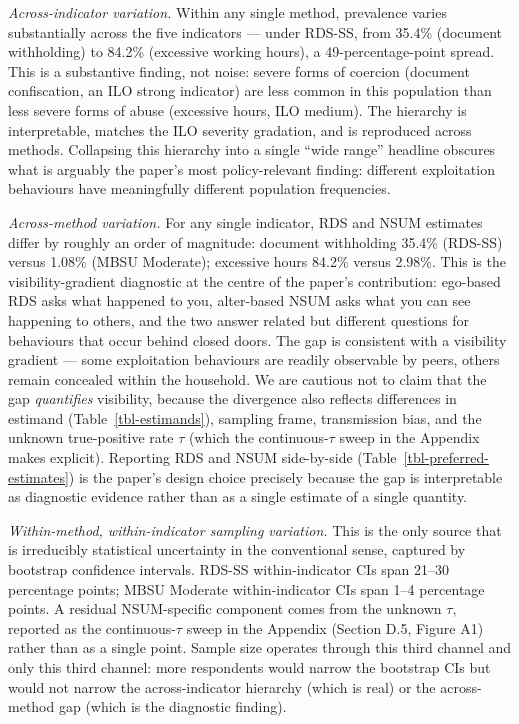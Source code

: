 \documentclass[
  12pt,
  letterpaper,
  DIV=11,
  numbers=noendperiod]{scrartcl}
\begin{document}
\emph{Across-indicator variation.} Within any single method, prevalence
varies substantially across the five indicators --- under RDS-SS, from
35.4\% (document withholding) to 84.2\% (excessive working hours), a
49-percentage-point spread. This is a substantive finding, not noise:
severe forms of coercion (document confiscation, an ILO strong
indicator) are less common in this population than less severe forms of
abuse (excessive hours, ILO medium). The hierarchy is interpretable,
matches the ILO severity gradation, and is reproduced across methods.
Collapsing this hierarchy into a single ``wide range'' headline obscures
what is arguably the paper's most policy-relevant finding: different
exploitation behaviours have meaningfully different population
frequencies.

\emph{Across-method variation.} For any single indicator, RDS and NSUM
estimates differ by roughly an order of magnitude: document withholding
35.4\% (RDS-SS) versus 1.08\% (MBSU Moderate); excessive hours 84.2\%
versus 2.98\%. This is the visibility-gradient diagnostic at the centre
of the paper's contribution: ego-based RDS asks what happened to you,
alter-based NSUM asks what you can see happening to others, and the two
answer related but different questions for behaviours that occur behind
closed doors. The gap is consistent with a visibility gradient --- some
exploitation behaviours are readily observable by peers, others remain
concealed within the household. We are cautious not to claim that the
gap \emph{quantifies} visibility, because the divergence also reflects
differences in estimand (Table~\ref{tbl-estimands}), sampling frame,
transmission bias, and the unknown true-positive rate \(\tau\) (which
the continuous-\(\tau\) sweep in the Appendix makes explicit). Reporting
RDS and NSUM side-by-side (Table~\ref{tbl-preferred-estimates}) is the
paper's design choice precisely because the gap is interpretable as
diagnostic evidence rather than as a single estimate of a single
quantity.

\emph{Within-method, within-indicator sampling variation.} This is the
only source that is irreducibly statistical uncertainty in the
conventional sense, captured by bootstrap confidence intervals. RDS-SS
within-indicator CIs span 21--30 percentage points; MBSU Moderate
within-indicator CIs span 1--4 percentage points. A residual
NSUM-specific component comes from the unknown \(\tau\), reported as the
continuous-\(\tau\) sweep in the Appendix (Section D.5, Figure A1)
rather than as a single point. Sample size operates through this third
channel and only this third channel: more respondents would narrow the
bootstrap CIs but would not narrow the across-indicator hierarchy (which
is real) or the across-method gap (which is the diagnostic finding).
\end{document}

